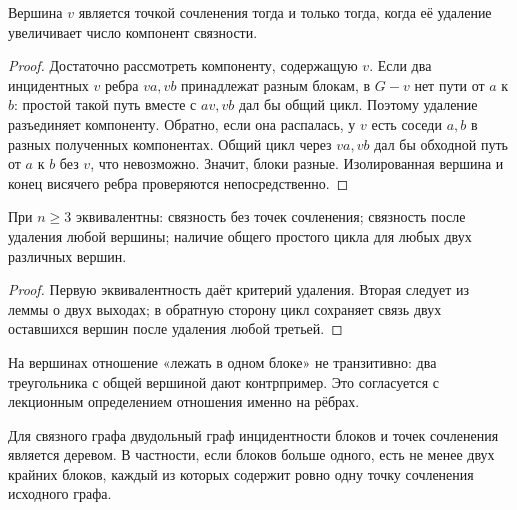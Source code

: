 \begin{theorem}
Вершина \(v\) является точкой сочленения тогда и только тогда,
когда её удаление увеличивает число компонент связности.
\end{theorem}
\begin{proof}
Достаточно рассмотреть компоненту, содержащую \(v\).
Если два инцидентных \(v\) ребра \(va,vb\) принадлежат разным блокам,
в \(G-v\) нет пути от \(a\) к \(b\): простой такой путь вместе
с \(av,vb\) дал бы общий цикл. Поэтому удаление разъединяет компоненту.
Обратно, если она распалась, у \(v\) есть соседи \(a,b\) в разных
полученных компонентах. Общий цикл через \(va,vb\) дал бы обходной
путь от \(a\) к \(b\) без \(v\), что невозможно. Значит, блоки разные.
Изолированная вершина и конец висячего ребра проверяются непосредственно.
\end{proof}
\begin{cor}
При \(n\ge3\) эквивалентны: связность без точек сочленения;
связность после удаления любой вершины; наличие общего простого цикла
для любых двух различных вершин.
\end{cor}
\begin{proof}
Первую эквивалентность даёт критерий удаления. Вторая следует из леммы
о двух выходах; в обратную сторону цикл сохраняет связь двух оставшихся
вершин после удаления любой третьей.
\end{proof}
На вершинах отношение «лежать в одном блоке» не транзитивно:
два треугольника с общей вершиной дают контрпример. Это согласуется
с лекционным определением отношения именно на рёбрах.
\begin{lemma}\label{lem:block-tree}
Для связного графа двудольный граф инцидентности блоков и точек
сочленения является деревом. В частности, если блоков больше одного,
есть не менее двух крайних блоков, каждый из которых содержит ровно
одну точку сочленения исходного графа.
\end{lemma}
